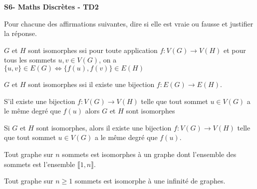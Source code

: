 \documentclass[french]{report}
\begin{document}
\begin{center}
    \huge{\textbf{S6- Maths Discrètes - TD2}}
\end{center}

\begin{exo}
    Pour chacune des affirmations suivantes, dire si elle est vraie ou fausse
    et justifier la réponse.
    \begin{q}{1}
        \(G\) et \(H\) sont isomorphes ssi pour toute application \(f:V(G)\to V(H)\)
        et pour tous les sommets \(u,v\in V(G)\), on a \(\{u,v\}\in E(G)
        \Leftrightarrow\{f(u),f(v)\}\in E(H)\)
    \end{q}
    \begin{q}{2}
        \(G\) et \(H\) sont isomorphes ssi il existe une bijection \(f:E(G)\to E(H)\).
    \end{q}
    \begin{q}{3}
        S'il existe une bijection \(f:V(G)\to V(H)\) telle que tout sommet \(u\in V(G)\)
        a le même degré que \(f(u)\) alors \(G\) et \(H\) sont isomorphes
    \end{q}
    \begin{q}{4}
        Si \(G\) et \(H\) sont isomorphes, alors il existe une bijection \(f:V(G)\to V(H)\)
        telle que tout sommet \(u\in V(G)\) a le même degré que \(f(u)\).
    \end{q}
    \begin{q}{5}
    \end{q}
    \begin{q}{6}
    \end{q}
    \begin{q}{7}
        Tout graphe sur \(n\) sommets est isomorphes à un graphe dont l'ensemble des
        sommets est l'ensemble \(\llbracket 1,n\rrbracket\).
    \end{q}
    \begin{q}{8}
        Tout graphe sur \(n\geq 1\) sommets est isomorphe à une infinité de graphes.
    \end{q}
\end{exo}
\end{document}
